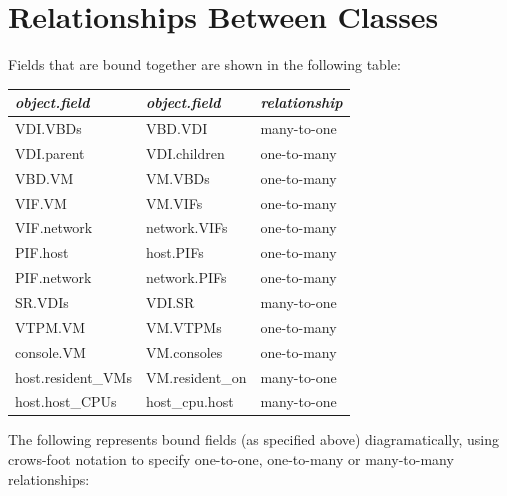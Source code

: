 \section{Relationships Between Classes}
Fields that are bound together are shown in the following table: 
\begin{center}\begin{tabular}{|ll|l|}
\hline
{\em object.field} & {\em object.field} & {\em relationship} \\

\hline
VDI.VBDs & VBD.VDI & many-to-one\\
VDI.parent & VDI.children & one-to-many\\
VBD.VM & VM.VBDs & one-to-many\\
VIF.VM & VM.VIFs & one-to-many\\
VIF.network & network.VIFs & one-to-many\\
PIF.host & host.PIFs & one-to-many\\
PIF.network & network.PIFs & one-to-many\\
SR.VDIs & VDI.SR & many-to-one\\
VTPM.VM & VM.VTPMs & one-to-many\\
console.VM & VM.consoles & one-to-many\\
host.resident\_VMs & VM.resident\_on & many-to-one\\
host.host\_CPUs & host\_cpu.host & many-to-one\\
\hline
\end{tabular}\end{center}

The following represents bound fields (as specified above) diagramatically, using crows-foot notation to specify one-to-one, one-to-many or many-to-many
                   relationships:

\begin{center}\end{center}
\
